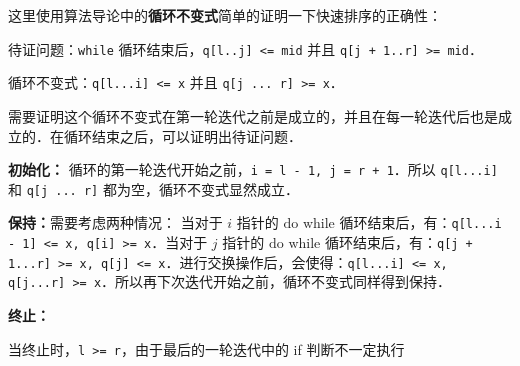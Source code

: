这里使用算法导论中的\textbf{循环不变式}简单的证明一下快速排序的正确性：

待证问题：\verb|while| 循环结束后，\verb|q[l..j] <= mid| 并且 \verb|q[j + 1..r] >= mid|．

循环不变式：\verb|q[l...i] <= x| 并且 \verb|q[j ... r] >= x|．

需要证明这个循环不变式在第一轮迭代之前是成立的，并且在每一轮迭代后也是成立的．在循环结束之后，可以证明出待证问题．

\textbf{初始化：} 循环的第一轮迭代开始之前，\verb|i = l - 1, j = r + 1|．所以 \verb|q[l...i]| 和 \verb|q[j ... r]| 都为空，循环不变式显然成立．

\textbf{保持：}需要考虑两种情况：
当对于 $i$ 指针的 $\text{do while}$ 循环结束后，有：\verb|q[l...i - 1] <= x, q[i] >= x|．当对于 $j$ 指针的 $\text{do while}$ 循环结束后，有：\verb|q[j + 1...r] >= x, q[j] <= x|．进行交换操作后，会使得：\verb|q[l...i] <= x, q[j...r] >= x|．所以再下次迭代开始之前，循环不变式同样得到保持．

\textbf{终止：}

当终止时，\verb|l >= r|，由于最后的一轮迭代中的 if 判断不一定执行
